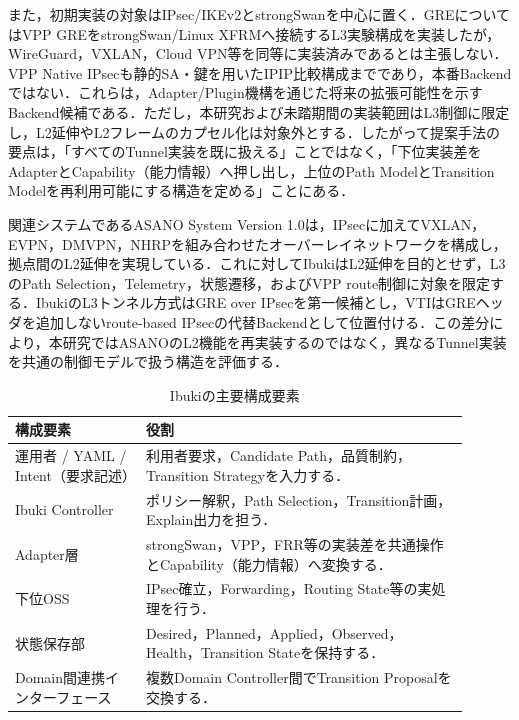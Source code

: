 \documentclass[11pt,a4paper,twoside]{ltjsarticle}
\begin{document}
また，初期実装の対象はIPsec/IKEv2とstrongSwanを中心に置く．GREについてはVPP GREをstrongSwan/Linux XFRMへ接続するL3実験構成を実装したが，WireGuard，VXLAN，Cloud VPN等を同等に実装済みであるとは主張しない．VPP Native IPsecも静的SA・鍵を用いたIPIP比較構成までであり，本番Backendではない．これらは，Adapter/Plugin機構を通じた将来の拡張可能性を示すBackend候補である．ただし，本研究および未踏期間の実装範囲はL3制御に限定し，L2延伸やL2フレームのカプセル化は対象外とする．したがって提案手法の要点は，「すべてのTunnel実装を既に扱える」ことではなく，「下位実装差をAdapterとCapability（能力情報）へ押し出し，上位のPath ModelとTransition Modelを再利用可能にする構造を定める」ことにある．

関連システムであるASANO System Version 1.0は，IPsecに加えてVXLAN，EVPN，DMVPN，NHRPを組み合わせたオーバーレイネットワークを構成し，拠点間のL2延伸を実現している．これに対してIbukiはL2延伸を目的とせず，L3のPath Selection，Telemetry，状態遷移，およびVPP route制御に対象を限定する．IbukiのL3トンネル方式はGRE over IPsecを第一候補とし，VTIはGREヘッダを追加しないroute-based IPsecの代替Backendとして位置付ける．この差分により，本研究ではASANOのL2機能を再実装するのではなく，異なるTunnel実装を共通の制御モデルで扱う構造を評価する．

\begin{table}[h]
\centering
\caption{Ibukiの主要構成要素}
\label{tab:architecture}
\begin{tabular}{>{\raggedright\arraybackslash}p{0.26\linewidth}>{\raggedright\arraybackslash}p{0.64\linewidth}}
\toprule
構成要素 & 役割 \\
\midrule
運用者 / YAML / Intent（要求記述） & 利用者要求，Candidate Path，品質制約，Transition Strategyを入力する． \\
Ibuki Controller & ポリシー解釈，Path Selection，Transition計画，Explain出力を担う． \\
Adapter層 & strongSwan，VPP，FRR等の実装差を共通操作とCapability（能力情報）へ変換する． \\
下位OSS & IPsec確立，Forwarding，Routing State等の実処理を行う． \\
状態保存部 & Desired，Planned，Applied，Observed，Health，Transition Stateを保持する． \\
Domain間連携インターフェース & 複数Domain Controller間でTransition Proposalを交換する． \\
\bottomrule
\end{tabular}
\end{table}
\end{document}
